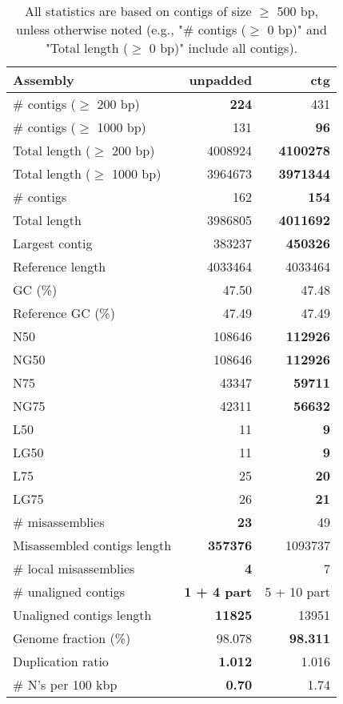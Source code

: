 \documentclass[12pt,a4paper]{article}
\begin{document}
\begin{table}[ht]
\begin{center}
\caption{All statistics are based on contigs of size $\geq$ 500 bp, unless otherwise noted (e.g., "\# contigs ($\geq$ 0 bp)" and "Total length ($\geq$ 0 bp)" include all contigs).}
\begin{tabular}{|l*{2}{|r}|}
\hline
Assembly & unpadded & ctg \\ \hline
\# contigs ($\geq$ 200 bp) & {\bf 224} & 431 \\ \hline
\# contigs ($\geq$ 1000 bp) & 131 & {\bf 96} \\ \hline
Total length ($\geq$ 200 bp) & 4008924 & {\bf 4100278} \\ \hline
Total length ($\geq$ 1000 bp) & 3964673 & {\bf 3971344} \\ \hline
\# contigs & 162 & {\bf 154} \\ \hline
Total length & 3986805 & {\bf 4011692} \\ \hline
Largest contig & 383237 & {\bf 450326} \\ \hline
Reference length & 4033464 & 4033464 \\ \hline
GC (\%) & 47.50 & 47.48 \\ \hline
Reference GC (\%) & 47.49 & 47.49 \\ \hline
N50 & 108646 & {\bf 112926} \\ \hline
NG50 & 108646 & {\bf 112926} \\ \hline
N75 & 43347 & {\bf 59711} \\ \hline
NG75 & 42311 & {\bf 56632} \\ \hline
L50 & 11 & {\bf 9} \\ \hline
LG50 & 11 & {\bf 9} \\ \hline
L75 & 25 & {\bf 20} \\ \hline
LG75 & 26 & {\bf 21} \\ \hline
\# misassemblies & {\bf 23} & 49 \\ \hline
Misassembled contigs length & {\bf 357376} & 1093737 \\ \hline
\# local misassemblies & {\bf 4} & 7 \\ \hline
\# unaligned contigs & {\bf 1 + 4 part} & 5 + 10 part \\ \hline
Unaligned contigs length & {\bf 11825} & 13951 \\ \hline
Genome fraction (\%) & 98.078 & {\bf 98.311} \\ \hline
Duplication ratio & {\bf 1.012} & 1.016 \\ \hline
\# N's per 100 kbp & {\bf 0.70} & 1.74 \\ \hline

\end{tabular}
\end{center}
\end{table}
\end{document}
